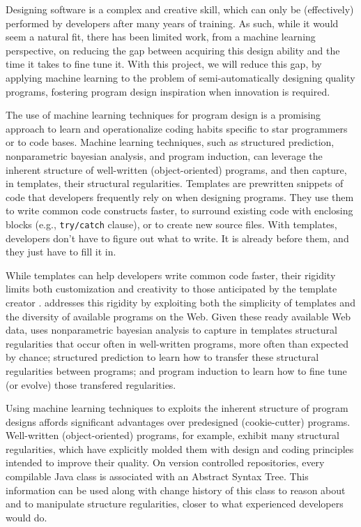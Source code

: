 Designing software is a complex and creative skill, which can only be
(effectively) performed by developers after many years of training. As such,
while it would seem a natural fit, there has been limited work, from a machine
learning perspective, on reducing the gap between acquiring this design ability
and the time it takes to fine tune it. With this project, we will reduce this
gap, by applying machine learning to the problem of semi-automatically designing
quality programs, fostering program design inspiration when innovation is
required.

The use of machine learning techniques for program design is a promising
approach to learn and operationalize coding habits specific to star programmers
or to code bases. Machine learning techniques, such as structured prediction,
nonparametric bayesian analysis, and program induction, can leverage the
inherent structure of well-written (object-oriented) programs, and then capture,
in templates, their structural regularities. Templates are prewritten snippets
of code that developers frequently rely on when designing programs. They use
them to write common code constructs faster, to surround existing code with
enclosing blocks (e.g., \texttt{try/catch} clause), or to create new source
files. With templates, developers don't have to figure out what to write. It is
already before them, and they just have to fill it in.

While templates can help developers write common code faster, their rigidity
limits both customization and creativity to those anticipated by the template
creator \cite{Kumar2011-hy}. \pdm addresses this rigidity by exploiting both the
simplicity of templates and the diversity of available programs on the Web.
Given these ready available Web data, \pdm uses nonparametric bayesian analysis
\cite{allamanis2014mining} to capture in templates structural regularities that
occur often in well-written programs, more often than expected by chance;
structured prediction \cite{collins2002discriminative} to learn how to transfer
these structural regularities between programs; and program induction
\cite{lake2015human} to learn how to fine tune (or evolve) those transfered
regularities.

Using machine learning techniques to exploits the inherent structure of program
designs affords significant advantages over predesigned (cookie-cutter)
programs. Well-written (object-oriented) programs, for example, exhibit many
structural regularities, which have explicitly molded them with design and coding
principles intended to improve their quality. On version controlled
repositories, every compilable Java class is associated with an Abstract Syntax
Tree. This information can be used along with change history of this class to
reason about and to manipulate structure regularities, closer to what
experienced developers would do.

